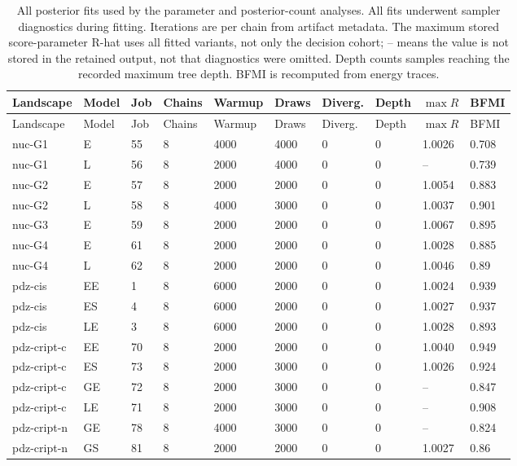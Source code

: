 \begingroup
\scriptsize
\setlength{\tabcolsep}{3pt}
\begin{longtable}[c]{llllllllll}
\caption{All posterior fits used by the parameter and posterior-count analyses. All fits underwent sampler diagnostics during fitting. Iterations are per chain from artifact metadata. The maximum stored score-parameter R-hat uses all fitted variants, not only the decision cohort; -- means the value is not stored in the retained output, not that diagnostics were omitted. Depth counts samples reaching the recorded maximum tree depth. BFMI is recomputed from energy traces.}\label{tab:hmc-fits}\\
\toprule
Landscape & Model & Job & Chains & Warmup & Draws & Diverg. & Depth & $\max\hat R$ & BFMI \\
\midrule
\endfirsthead
\toprule
Landscape & Model & Job & Chains & Warmup & Draws & Diverg. & Depth & $\max\hat R$ & BFMI \\
\midrule
\endhead
\bottomrule
\endfoot
nuc-G1 & E & 55 & 8 & 4000 & 4000 & 0 & 0 & 1.0026 & 0.708 \\
nuc-G1 & L & 56 & 8 & 2000 & 4000 & 0 & 0 & -- & 0.739 \\
nuc-G2 & E & 57 & 8 & 2000 & 2000 & 0 & 0 & 1.0054 & 0.883 \\
nuc-G2 & L & 58 & 8 & 4000 & 3000 & 0 & 0 & 1.0037 & 0.901 \\
nuc-G3 & E & 59 & 8 & 2000 & 2000 & 0 & 0 & 1.0067 & 0.895 \\
nuc-G4 & E & 61 & 8 & 2000 & 2000 & 0 & 0 & 1.0028 & 0.885 \\
nuc-G4 & L & 62 & 8 & 2000 & 2000 & 0 & 0 & 1.0046 & 0.89 \\
pdz-cis & EE & 1 & 8 & 6000 & 2000 & 0 & 0 & 1.0024 & 0.939 \\
pdz-cis & ES & 4 & 8 & 6000 & 2000 & 0 & 0 & 1.0027 & 0.937 \\
pdz-cis & LE & 3 & 8 & 6000 & 2000 & 0 & 0 & 1.0028 & 0.893 \\
pdz-cript-c & EE & 70 & 8 & 2000 & 2000 & 0 & 0 & 1.0040 & 0.949 \\
pdz-cript-c & ES & 73 & 8 & 2000 & 3000 & 0 & 0 & 1.0026 & 0.924 \\
pdz-cript-c & GE & 72 & 8 & 2000 & 3000 & 0 & 0 & -- & 0.847 \\
pdz-cript-c & LE & 71 & 8 & 2000 & 3000 & 0 & 0 & -- & 0.908 \\
pdz-cript-n & GE & 78 & 8 & 4000 & 3000 & 0 & 0 & -- & 0.824 \\
pdz-cript-n & GS & 81 & 8 & 2000 & 2000 & 0 & 0 & 1.0027 & 0.86 \\

\end{longtable}
